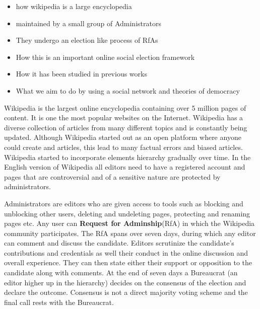 



\begin{itemize}
    \item how wikipedia is a large encyclopedia
    \item maintained by a small group of Administrators
    \item They undergo an election like process of RfAs
    \item How this is an important online social election framework
    \item How it has been studied in previous works 
    \item What we aim to do by using a social network and theories of democracy
\end{itemize}

Wikipedia is the largest online encyclopedia containing over 5 million pages of content. It is one the most popular websites on the Internet. Wikipedia has a diverse collection of articles from many different topics and is constantly being updated. Although Wikipedia started out as an open platform where anyone could create and articles, this lead to many factual errors and biased articles. Wikipedia started to incorporate elements hierarchy gradually over time. In the English version of Wikipedia all editors need to have a registered account and pages that are controversial and of a sensitive nature are protected by administrators.
\smallskip

Administrators are editors who are given access to tools such as blocking and unblocking other users, deleting and undeleting pages, protecting and renaming pages etc. Any user can \textbf{Request for Adminship}(RfA) in which the Wikipedia community participates. The RfA spans over seven days, during which any editor can comment and discuss the candidate. Editors scrutinize the candidate's contributions and credentials as well their conduct in the online discussion and overall experience. They can then state either their support or opposition to the candidate along with comments. At the end of seven days a Bureaucrat (an editor higher up in the hierarchy) decides on the consensus of the election and declare the outcome. Consensus is not a direct majority voting scheme and the final call rests with the Bureaucrat.
\smallskip

